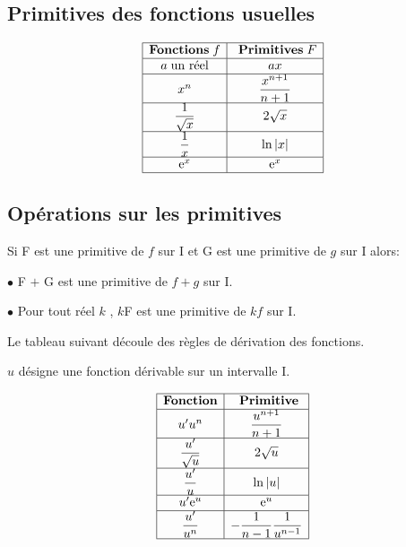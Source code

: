 \medskip
\subsection*{Primitives des fonctions usuelles}

$$\begin{array}{|c|c|}
\hline
\textbf{Fonctions} \;f  &\textbf{ Primitives} \; F   \\ 
\hline
 a \; \text{un réel}  & ax \\
\hline
x^{n}    & \dfrac{x^{n+1}}{n+1} \\
\hline
 \dfrac{1}{\sqrt{x}}   &  2\sqrt{x}   \\
\hline
 \dfrac{1}{x}     &  \ln |x|     \\
\hline
\mathrm{e}^{x}     &\mathrm{e}^{x}    \\
\hline
\end{array}$$


\subsection*{Opérations sur les primitives}
\begin{property}
\noindent
Si F est une primitive de $f$ sur I et  G est une primitive de $g$ sur I alors:

\medskip
\noindent
$ \bullet $  F $+$ G est une primitive de $f + g$ sur I.

\medskip
\noindent
$ \bullet  $  Pour tout réel  $k$ ,\;  $k$F est une primitive de $kf$ sur I.
\end{property}
\medskip

Le tableau suivant découle des règles de dérivation des fonctions.

$ u $ désigne une fonction dérivable sur un intervalle I.


$$\begin{array}{|c|c|}
\hline
\textbf{Fonction}  &\textbf{ Primitive}     \\ 
\hline
 u'u^{n}   & \dfrac{u^{n+1}}{n+1}   \\
\hline
\dfrac{u'}{\sqrt{u}}    &  2\sqrt{u}    \\
\hline
\dfrac{u'}{u}  & \ln |u|      \\
\hline
u'\eexp{u}   &   \eexp{u}    \\
\hline
\dfrac{u'}{u^{n}}     &- \dfrac{1}{n-1} \dfrac{1}{u^{n-1}} \\
\hline

\end{array}$$



